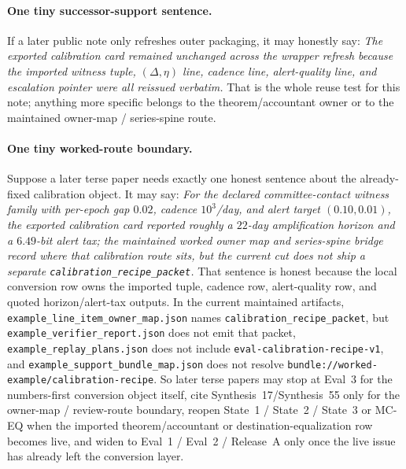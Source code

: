 \documentclass[11pt]{article}
\begin{document}
\paragraph{One tiny successor-support sentence.}
If a later public note only refreshes outer packaging, it may honestly say: \emph{The exported calibration card remained unchanged across the wrapper refresh because the imported witness tuple, $(\Delta,\eta)$ line, cadence line, alert-quality line, and escalation pointer were all reissued verbatim.}
That is the whole reuse test for this note; anything more specific belongs to the theorem/accountant owner or to the maintained owner-map / series-spine route.

\paragraph{One tiny worked-route boundary.}
Suppose a later terse paper needs exactly one honest sentence about the already-fixed calibration object. It may say: \emph{For the declared committee-contact witness family with per-epoch gap $0.02$, cadence $10^3$/day, and alert target $(0.10,0.01)$, the exported calibration card reported roughly a $22$-day amplification horizon and a $6.49$-bit alert tax; the maintained worked owner map and series-spine bridge record where that calibration route sits, but the current cut does not ship a separate \nolinkurl{calibration_recipe_packet}.} That sentence is honest because the local conversion row owns the imported tuple, cadence row, alert-quality row, and quoted horizon/alert-tax outputs. In the current maintained artifacts, \nolinkurl{example_line_item_owner_map.json} names \nolinkurl{calibration_recipe_packet}, but \nolinkurl{example_verifier_report.json} does not emit that packet, \nolinkurl{example_replay_plans.json} does not include \nolinkurl{eval-calibration-recipe-v1}, and \nolinkurl{example_support_bundle_map.json} does not resolve \nolinkurl{bundle://worked-example/calibration-recipe}. So later terse papers may stop at Eval~3 for the numbers-first conversion object itself, cite Synthesis~17/Synthesis~55 only for the owner-map / review-route boundary, reopen State~1 / State~2 / State~3 or MC-EQ when the imported theorem/accountant or destination-equalization row becomes live, and widen to Eval~1 / Eval~2 / Release~A only once the live issue has already left the conversion layer.\cite{state1,state2,state3,series:mceq,series:eval1,series:advantagecontracts,series:releaseproperty,series:workedexample,series:seriesspines}
\end{document}
